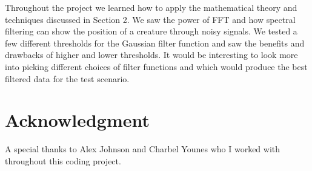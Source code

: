 \documentclass[12pt]{article}%
\numberwithin{equation}{subsection}
\begin{document}
Throughout the project we learned how to apply the mathematical theory and techniques discussed in Section 2. We saw the power of FFT and how spectral filtering can show the position of a creature through noisy signals. We tested a few different thresholds for the Gaussian filter function and saw the benefits and drawbacks of higher and lower thresholds. It would be interesting to look more into picking different choices of filter functions and which would produce the best filtered data for the test scenario. 

\section*{Acknowledgment}

A special thanks to Alex Johnson and Charbel Younes who I worked with throughout this coding project. 
\end{document}
